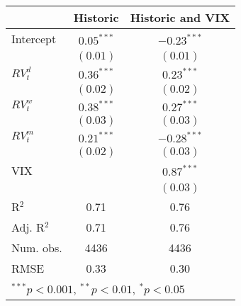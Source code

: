 
\begin{tabular}{l c c }
\hline
 & Historic & Historic and VIX \\
\hline
Intercept    & $0.05^{***}$ & $-0.23^{***}$ \\
             & $(0.01)$     & $(0.01)$      \\
$RV_{t}^{d}$ & $0.36^{***}$ & $0.23^{***}$  \\
             & $(0.02)$     & $(0.02)$      \\
$RV_{t}^{w}$ & $0.38^{***}$ & $0.27^{***}$  \\
             & $(0.03)$     & $(0.03)$      \\
$RV_{t}^{m}$ & $0.21^{***}$ & $-0.28^{***}$ \\
             & $(0.02)$     & $(0.03)$      \\
VIX          &              & $0.87^{***}$  \\
             &              & $(0.03)$      \\
\hline
R$^2$        & 0.71         & 0.76          \\
Adj. R$^2$   & 0.71         & 0.76          \\
Num. obs.    & 4436         & 4436          \\
RMSE         & 0.33         & 0.30          \\
\hline
\multicolumn{3}{l}{\scriptsize{$^{***}p<0.001$, $^{**}p<0.01$, $^*p<0.05$}}
\end{tabular}
